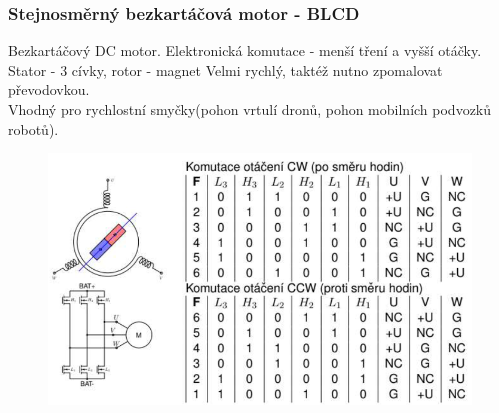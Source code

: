 \subsubsection{Stejnosměrný bezkartáčová motor - BLCD}
Bezkartáčový DC motor. Elektronická komutace - menší tření a vyšší otáčky.\\
Stator - 3 cívky, rotor - magnet
Velmi rychlý, taktéž nutno zpomalovat převodovkou.\\
Vhodný pro rychlostní smyčky(pohon vrtulí dronů, pohon mobilních podvozků robotů).\\
\begin{figure}[h!]
    \centering
    \includegraphics[scale = 0.4]{img/BLCD.png}
\end{figure}

